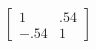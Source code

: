 \documentclass[preview]{standalone}
\begin{document}
\begin{align*}
\begin{bmatrix}1 & .54\\ -.54 & 1 \end{bmatrix}
\end{align*}
\end{document}
